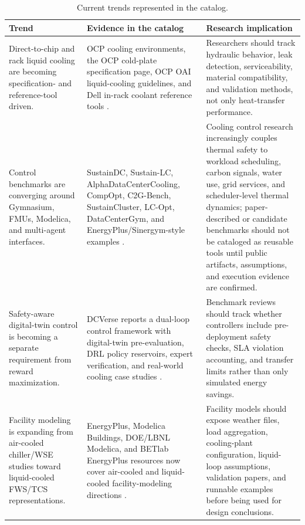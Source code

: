 \documentclass[11pt]{article}
\begin{document}
\begin{table}[t]
\centering
\caption{Current trends represented in the catalog.}
\label{tab:trends}
\begin{tabularx}{\textwidth}{p{}X X}
\toprule
Trend & Evidence in the catalog & Research implication \\
\midrule
Direct-to-chip and rack liquid cooling are becoming specification- and reference-tool driven. & OCP cooling environments, the OCP cold-plate specification page, OCP OAI liquid-cooling guidelines, and Dell in-rack coolant reference tools \cite{OCPCoolingEnvironments2026,OCPColdPlate2026,OCPOAI2023,DellIRC2026}. & Researchers should track hydraulic behavior, leak detection, serviceability, material compatibility, and validation methods, not only heat-transfer performance. \\
\addlinespace
Control benchmarks are converging around Gymnasium, FMUs, Modelica, and multi-agent interfaces. & SustainDC, Sustain-LC, AlphaDataCenterCooling, CompOpt, C2G-Bench, SustainCluster, LC-Opt, DataCenterGym, and EnergyPlus/Sinergym-style examples \cite{HPEDCRL2026,HPESustainLC2026,AlphaDataCenterCooling2026,HPECompOpt2026,HPEC2GBench2026,HPESustainCluster2026,NaugLCOpt2025,PathakDataCenterGym2026,EnergyPlusDOE2026}. & Cooling control research increasingly couples thermal safety to workload scheduling, carbon signals, water use, grid services, and scheduler-level thermal dynamics; paper-described or candidate benchmarks should not be cataloged as reusable tools until public artifacts, assumptions, and execution evidence are confirmed. \\
\addlinespace
Safety-aware digital-twin control is becoming a separate requirement from reward maximization. & DCVerse reports a dual-loop control framework with digital-twin pre-evaluation, DRL policy reservoirs, expert verification, and real-world cooling case studies \cite{ZhangDCVerse2026}. & Benchmark reviews should track whether controllers include pre-deployment safety checks, SLA violation accounting, and transfer limits rather than only simulated energy savings. \\
\addlinespace
Facility modeling is expanding from air-cooled chiller/WSE studies toward liquid-cooled FWS/TCS representations. & EnergyPlus, Modelica Buildings, DOE/LBNL Modelica, and BETlab EnergyPlus resources now cover air-cooled and liquid-cooled facility-modeling directions \cite{EnergyPlusDOE2026,ModelicaBuildings2026,PSUDataCenterModelica2026,BETlabDataCenterModeling2026}. & Facility models should expose weather files, load aggregation, cooling-plant configuration, liquid-loop assumptions, validation papers, and runnable examples before being used for design conclusions. \\

\end{tabularx}
\end{table}
\end{document}
